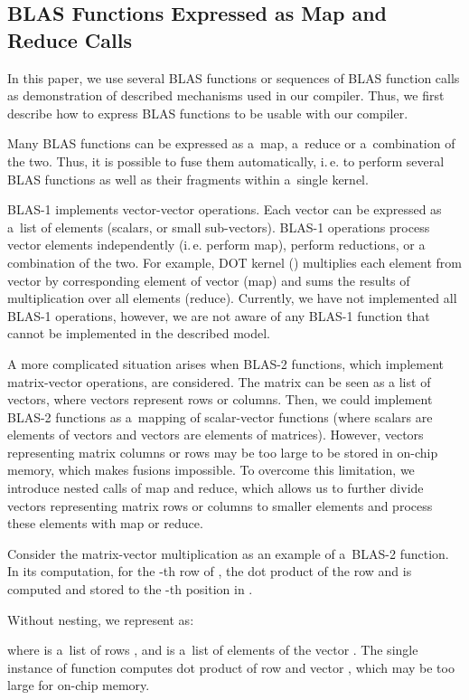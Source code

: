 \documentclass[final]{siamltex}
\def\ie{i.\,e.}
\begin{document}
{\subsection{BLAS Functions Expressed as Map and Reduce Calls}
\label{sect:blas_mapred}

In this paper, we use several BLAS functions or sequences of BLAS function calls as demonstration of described mechanisms used in our compiler. Thus, we first describe how to express BLAS functions to be usable with our compiler.

Many BLAS functions can be expressed as a~map, a~reduce or a~combination of the two. Thus, it is possible to fuse them automatically, \ie{} to perform several BLAS functions as well as their fragments within a~single kernel.

BLAS-1 implements vector-vector operations. Each vector can be expressed as a~list of elements (scalars, or small sub-vectors). BLAS-1 operations process vector elements independently (\ie{} perform map), perform reductions, or a combination of the two. For example, DOT kernel () multiplies each element from vector  by corresponding element of vector  (map) and sums the  results of multiplication over all elements (reduce). Currently, we have not implemented all BLAS-1 operations, however, we are not aware of any BLAS-1 function that cannot be implemented in the described model.

A more complicated situation arises when BLAS-2 functions, which implement matrix-vector operations, are considered. 
The matrix can be seen as a list of vectors, where vectors represent rows or columns. Then, we could implement BLAS-2 functions as a~mapping of scalar-vector functions (where scalars are elements of vectors and vectors are elements of matrices).
However, vectors representing matrix columns or rows may be too large to be stored in on-chip memory, which makes fusions impossible. To overcome this limitation, we introduce nested calls of map and reduce, which allows us to further divide vectors representing matrix rows or columns to smaller elements and process these elements with map or reduce. 

Consider the matrix-vector multiplication  as an example of a~BLAS-2 function. In its computation, for the -th row of , the dot product of the row and  is computed and stored to the -th position in .

Without nesting, we represent  as:

where  is a~list of rows ,  and  is a~list of elements of the vector . The single instance of function  computes dot product of row  and vector , which may be too large for on-chip memory.

}
\end{document}

